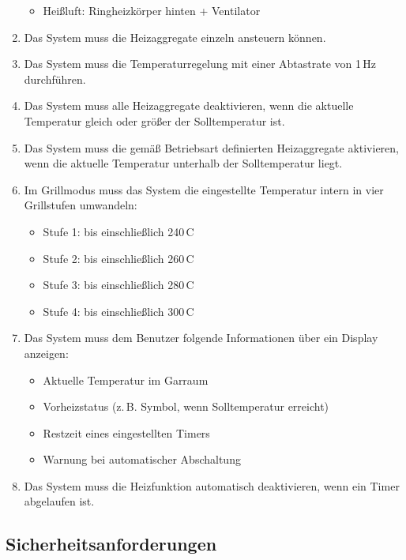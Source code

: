\documentclass[a4paper,12pt]{article}
\begin{document}
\begin{enumerate}[label=\textbf{R-1.\arabic*}, ref=R-1.\arabic*, itemsep=0pt, topsep=0pt, font=\bfseries]
\begin{itemize}
        \item Heißluft: Ringheizkörper hinten + Ventilator
    \end{itemize}
    \item \label{req:1.7} Das System muss die Heizaggregate einzeln ansteuern können.
    \item \label{req:1.8} Das System muss die Temperaturregelung mit einer Abtastrate von 1\,Hz durchführen.
    \item \label{req:1.9} Das System muss alle Heizaggregate deaktivieren, wenn die aktuelle Temperatur gleich oder größer der Solltemperatur ist.
    \item \label{req:1.10} Das System muss die gemäß Betriebsart definierten Heizaggregate aktivieren, wenn die aktuelle Temperatur unterhalb der Solltemperatur liegt.
    \item \label{req:1.11} Im Grillmodus muss das System die eingestellte Temperatur intern in vier Grillstufen umwandeln:
    \begin{itemize}
        \item Stufe 1: bis einschließlich 240\,\textdegree{}C
        \item Stufe 2: bis einschließlich 260\,\textdegree{}C
        \item Stufe 3: bis einschließlich 280\,\textdegree{}C
        \item Stufe 4: bis einschließlich 300\,\textdegree{}C
    \end{itemize}
    \item \label{req:1.12} Das System muss dem Benutzer folgende Informationen über ein Display anzeigen:
    \begin{itemize}
        \item Aktuelle Temperatur im Garraum
        \item Vorheizstatus (z.\,B. Symbol, wenn Solltemperatur erreicht)
        \item Restzeit eines eingestellten Timers
        \item Warnung bei automatischer Abschaltung
    \end{itemize}
    \item \label{req:1.13} Das System muss die Heizfunktion automatisch deaktivieren, wenn ein Timer abgelaufen ist.
\end{enumerate}

\subsection{Sicherheitsanforderungen}
\end{document}
